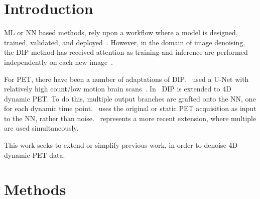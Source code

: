 \section{Introduction} \label{sec:introduction}
     \acrlong{ML} or \gls{NN} based methods, rely upon a workflow where a model is designed, trained, validated, and deployed~\cite{Krose2011AnNetworks}. %
    However, in the domain of image denoising, the \gls{DIP} method has received attention as training and inference are performed independently on each new image~\cite{Ulyanov2018DeepPrior}. %
    
    For \acrshort{PET}, there have been a number of adaptations of \gls{DIP}.~\cite{Gong2019PETPrior} used a U-Net with relatively high count/low motion brain scans~\cite{Weng2015U-Net:Segmentation}. In~\cite{Hashimoto20214DNetwork} \gls{DIP} is extended to \acrshort{4D} dynamic \acrshort{PET}. To do this, multiple output branches are grafted onto the \gls{NN}, one for each dynamic time point.~\cite{Hashimoto2019DynamicDatasets} uses the original or static \acrshort{PET} acquisition as input to the \gls{NN}, rather than noise.~\cite{Yang2022SimultaneousPrior} represents a more recent extension, where multiple  are used simultaneously.
    
    This work seeks to extend or simplify previous work, in order to denoise \acrshort{4D} dynamic \acrshort{PET} data.

\vspace{-0.4cm}
    
\section{Methods}\label{sec:methods}
